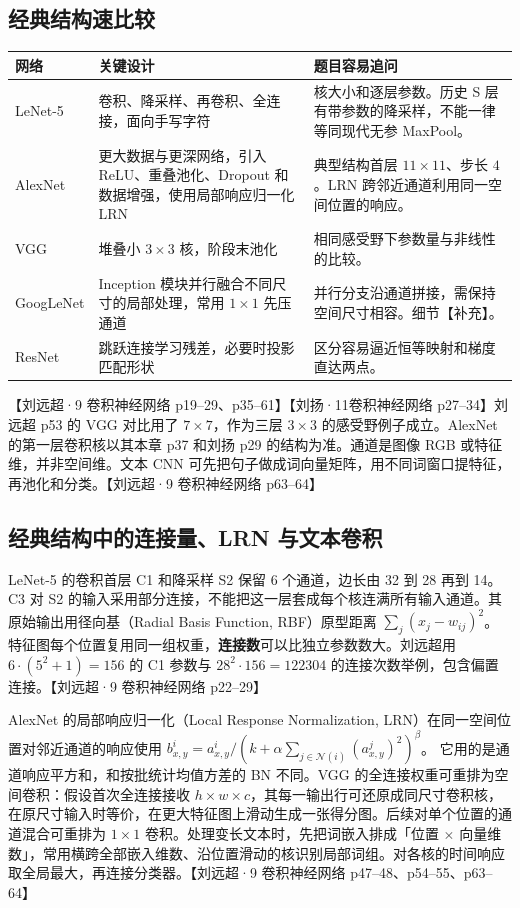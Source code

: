 \documentclass[UTF8,a4paper,zihao=-4,fontset=fandol]{ctexrep}
\begin{document}
\subsection*{经典结构速比较}

\begin{center}
\begin{tabularx}{\linewidth}{@{}lXX@{}}
\toprule
网络 & 关键设计 & 题目容易追问\\
\midrule
LeNet-5 & 卷积、降采样、再卷积、全连接，面向手写字符 & 核大小和逐层参数。历史 S 层有带参数的降采样，不能一律等同现代无参 MaxPool。\\
AlexNet & 更大数据与更深网络，引入 ReLU、重叠池化、Dropout 和数据增强，使用局部响应归一化 LRN & 典型结构首层 $11\times11$、步长 $4$。LRN 跨邻近通道利用同一空间位置的响应。\\
VGG & 堆叠小 $3\times3$ 核，阶段末池化 & 相同感受野下参数量与非线性的比较。\\
GoogLeNet & Inception 模块并行融合不同尺寸的局部处理，常用 $1\times1$ 先压通道 & 并行分支沿通道拼接，需保持空间尺寸相容。细节【补充】。\\
ResNet & 跳跃连接学习残差，必要时投影匹配形状 & 区分容易逼近恒等映射和梯度直达两点。\\
\bottomrule
\end{tabularx}
\end{center}
【刘远超·9 卷积神经网络 p19--29、p35--61】【刘扬·11卷积神经网络 p27--34】刘远超 p53 的 VGG 对比用了 $7\times7$，作为三层 $3\times3$ 的感受野例子成立。AlexNet 的第一层卷积核以其本章 p37 和刘扬 p29 的结构为准。通道是图像 RGB 或特征维，并非空间维。文本 CNN 可先把句子做成词向量矩阵，用不同词窗口提特征，再池化和分类。【刘远超·9 卷积神经网络 p63--64】

\subsection*{经典结构中的连接量、LRN 与文本卷积}
LeNet-5 的卷积首层 C1 和降采样 S2 保留 6 个通道，边长由 32 到 28 再到 14。C3 对 S2 的输入采用部分连接，不能把这一层套成每个核连满所有输入通道。其原始输出用径向基（Radial Basis Function, RBF）原型距离 $\sum_j(x_j-w_{ij})^2$。特征图每个位置复用同一组权重，\textbf{连接数}可以比独立参数数大。刘远超用 $6\cdot(5^2+1)=156$ 的 C1 参数与 $28^2\cdot156=122304$ 的连接次数举例，包含偏置连接。【刘远超·9 卷积神经网络 p22–29】

AlexNet 的局部响应归一化（Local Response Normalization, LRN）在同一空间位置对邻近通道的响应使用
$b^i_{x,y}=a^i_{x,y}/(k+\alpha\sum_{j\in\mathcal N(i)}(a^j_{x,y})^2)^\beta$。
它用的是通道响应平方和，和按批统计均值方差的 BN 不同。VGG 的全连接权重可重排为空间卷积：假设首次全连接接收 $h\times w\times c$，其每一输出行可还原成同尺寸卷积核，在原尺寸输入时等价，在更大特征图上滑动生成一张得分图。后续对单个位置的通道混合可重排为 $1\times1$ 卷积。处理变长文本时，先把词嵌入排成「位置 $\times$ 向量维数」，常用横跨全部嵌入维数、沿位置滑动的核识别局部词组。对各核的时间响应取全局最大，再连接分类器。【刘远超·9 卷积神经网络 p47–48、p54–55、p63–64】
\end{document}
